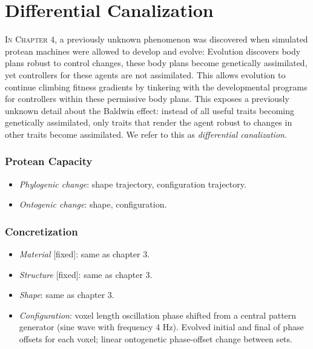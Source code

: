 

\section{Differential Canalization}

\textsc{In Chapter 4,}
a previously unknown phenomenon was discovered when simulated protean machines were allowed to develop and evolve: 
Evolution discovers body plans robust to control changes, these body plans become genetically assimilated, yet controllers for these agents are not assimilated. 
This allows evolution to continue climbing fitness gradients by tinkering with the developmental programs for controllers within these permissive body plans. 
This exposes a previously unknown detail about the Baldwin effect: instead of all useful traits becoming genetically assimilated, only traits that render the agent robust to changes in other traits become assimilated. 
We refer to this as \textit{differential canalization}.


\subsubsection*{Protean Capacity}

\begin{itemize}
    \item \textit{Phylogenic change}: shape trajectory, configuration trajectory.
    \item \textit{Ontogenic change}: shape, configuration.
\end{itemize}


\subsubsection*{Concretization}

\begin{itemize}
    \item \textit{Material} [fixed]: same as chapter 3.
    \item \textit{Structure} [fixed]: same as chapter 3.
    \item \textit{Shape}: same as chapter 3.
    \item \textit{Configuration}: voxel length oscillation phase shifted from a central pattern generator (sine wave with frequency 4 Hz).
    Evolved initial and final of phase offsets for each voxel; linear ontogenetic phase-offset change between sets.
\end{itemize}




